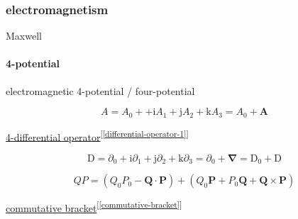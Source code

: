\documentclass[
]{book}
\theoremstyle{definition}
\theoremstyle{definition}
\theoremstyle{definition}
\theoremstyle{definition}
\theoremstyle{remark}
\begin{document}
\hypertarget{electromagnetism}{%
\subsubsection{electromagnetism}\label{electromagnetism}}

Maxwell

\hypertarget{potential}{%
\paragraph{4-potential}\label{potential}}

electromagnetic 4-potential / four-potential

\[
A=A_{{\scriptscriptstyle 0}}++\mathrm{i}A_{{\scriptscriptstyle 1}}+\mathrm{j}A_{{\scriptscriptstyle 2}}+\mathrm{k}A_{{\scriptscriptstyle 3}}=A_{0}+\boldsymbol{A}
\]

\protect\hyperlink{differential-operator-1}{4-differential operator}\textsuperscript{{[}\ref{differential-operator-1}{]}}

\[
\mathrm{D}=\partial_{{\scriptscriptstyle 0}}+\mathrm{i}\partial_{{\scriptscriptstyle 1}}+\mathrm{j}\partial_{{\scriptscriptstyle 2}}+\mathrm{k}\partial_{{\scriptscriptstyle 3}}=\partial_{{\scriptscriptstyle 0}}+\boldsymbol{\nabla}=\mathrm{D}_{{\scriptscriptstyle 0}}+\boldsymbol{\mathrm{D}}
\]

\[
QP=\left(Q_{{\scriptscriptstyle 0}}P_{{\scriptscriptstyle 0}}-\boldsymbol{Q}\cdot\boldsymbol{P}\right)+\left(Q_{{\scriptscriptstyle 0}}\boldsymbol{P}+P_{{\scriptscriptstyle 0}}\boldsymbol{Q}+\boldsymbol{Q}\times\boldsymbol{P}\right)
\]

\protect\hyperlink{commutative-bracket}{commutative bracket}\textsuperscript{{[}\ref{commutative-bracket}{]}}
\end{document}
